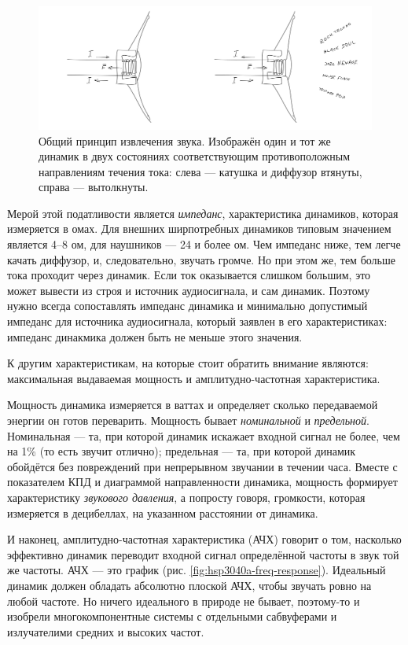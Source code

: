 \begin{figure}
  \centering
  \includegraphics{sketches/speaker-internals}
  \caption{Общий принцип извлечения звука. Изображён один и тот же динамик в двух состояниях соответствующим противоположным направлениям течения тока: слева — катушка и диффузор втянуты, справа — вытолкнуты.}
\end{figure}

Мерой этой податливости является \emph{импеданс}, характеристика динамиков, которая измеряется в омах. Для внешних ширпотребных динамиков типовым значением является 4--8 ом, для наушников — 24 и более ом. Чем импеданс ниже, тем легче качать диффузор, и, следовательно, звучать громче. Но при этом же, тем больше тока проходит через динамик. Если ток оказывается слишком большим, это может вывести из строя и источник аудиосигнала, и сам динамик. Поэтому нужно всегда сопоставлять импеданс динамика и минимально допустимый импеданс для источника аудиосигнала, который заявлен в его характеристиках: импеданс динакмика должен быть не меньше этого значения.

К другим характеристикам, на которые стоит обратить внимание являются: максимальная выдаваемая мощность и амплитудно-частотная характеристика.

Мощность динамика измеряется в ваттах и определяет сколько передаваемой энергии он готов переварить. Мощность бывает \emph{номинальной} и \emph{предельной}. Номинальная — та, при которой динамик искажает входной сигнал не более, чем на 1\% (то есть звучит отлично); предельная — та, при которой динамик обойдётся без повреждений при непрерывном звучании в течении часа. Вместе с показателем КПД и диаграммой направленности динамика, мощность формирует характеристику \emph{звукового давления}, а попросту говоря, громкости, которая измеряется в децибеллах, на указанном расстоянии от динамика.

И наконец, амплитудно-частотная характеристика (АЧХ) говорит о том, насколько эффективно динамик переводит входной сигнал определённой частоты в звук той же частоты. АЧХ — это график (рис. \ref{fig:hsp3040a-freq-response}). Идеальный динамик должен обладать абсолютно плоской АЧХ, чтобы звучать ровно на любой частоте. Но ничего идеального в природе не бывает, поэтому-то и изобрели многокомпонентные системы с отдельными сабвуферами и излучателими средних и высоких частот.

